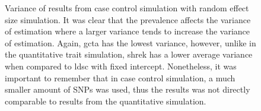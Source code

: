 \begin{figure}
{				
				\label{fig:ldscInCC50RandVar}
			}
			\caption[Case Control with Random Effect Size Simulation Result(Variance)]
			{Variance of results from case control simulation with random effect size simulation.
				It was clear that the prevalence affects the variance of estimation where a larger variance tends to increase the variance of estimation.
				Again, \gls{gcta} has the lowest variance, however, unlike in the quantitative trait simulation, \gls{shrek} has a lower average variance when compared to \gls{ldsc} with fixed intercept.
				Nonetheless, it was important to remember that in case control simulation, a much smaller amount of \glspl{SNP} was used, thus the results was not directly comparable to results from the quantitative simulation.
			} 
			\label{fig:CC50RandVar}
		\end{figure}
		
